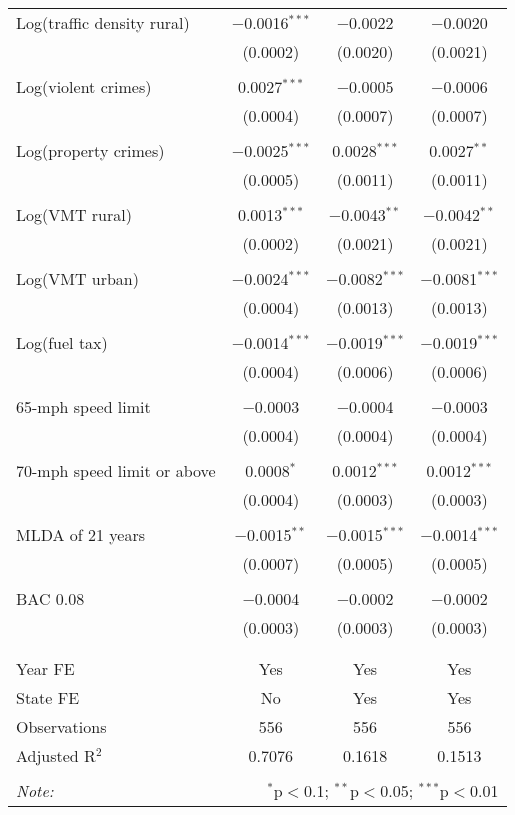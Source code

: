 \begin{table}[!htbp]
\begin{tabular}{@{\extracolsep{5pt}}lccc}
 Log(traffic density rural) & $-$0.0016$^{***}$ & $-$0.0022 & $-$0.0020 \\ 
  & (0.0002) & (0.0020) & (0.0021) \\ 
  & & & \\ 
 Log(violent crimes) & 0.0027$^{***}$ & $-$0.0005 & $-$0.0006 \\ 
  & (0.0004) & (0.0007) & (0.0007) \\ 
  & & & \\ 
 Log(property crimes) & $-$0.0025$^{***}$ & 0.0028$^{***}$ & 0.0027$^{**}$ \\ 
  & (0.0005) & (0.0011) & (0.0011) \\ 
  & & & \\ 
 Log(VMT rural) & 0.0013$^{***}$ & $-$0.0043$^{**}$ & $-$0.0042$^{**}$ \\ 
  & (0.0002) & (0.0021) & (0.0021) \\ 
  & & & \\ 
 Log(VMT urban) & $-$0.0024$^{***}$ & $-$0.0082$^{***}$ & $-$0.0081$^{***}$ \\ 
  & (0.0004) & (0.0013) & (0.0013) \\ 
  & & & \\ 
 Log(fuel tax) & $-$0.0014$^{***}$ & $-$0.0019$^{***}$ & $-$0.0019$^{***}$ \\ 
  & (0.0004) & (0.0006) & (0.0006) \\ 
  & & & \\ 
 65-mph speed limit & $-$0.0003 & $-$0.0004 & $-$0.0003 \\ 
  & (0.0004) & (0.0004) & (0.0004) \\ 
  & & & \\ 
 70-mph speed limit or above & 0.0008$^{*}$ & 0.0012$^{***}$ & 0.0012$^{***}$ \\ 
  & (0.0004) & (0.0003) & (0.0003) \\ 
  & & & \\ 
 MLDA of 21 years & $-$0.0015$^{**}$ & $-$0.0015$^{***}$ & $-$0.0014$^{***}$ \\ 
  & (0.0007) & (0.0005) & (0.0005) \\ 
  & & & \\ 
 BAC 0.08 & $-$0.0004 & $-$0.0002 & $-$0.0002 \\ 
  & (0.0003) & (0.0003) & (0.0003) \\ 
  & & & \\ 
\hline \\[-1.8ex] 
Year FE & Yes & Yes & Yes \\ 
State FE & No & Yes & Yes \\ 
Observations & 556 & 556 & 556 \\ 
Adjusted R$^{2}$ & 0.7076 & 0.1618 & 0.1513 \\ 
\hline 
\hline \\[-1.8ex] 
\textit{Note:}  & \multicolumn{3}{r}{$^{*}$p$<$0.1; $^{**}$p$<$0.05; $^{***}$p$<$0.01} \\ 
\end{tabular} 
\end{table} 
